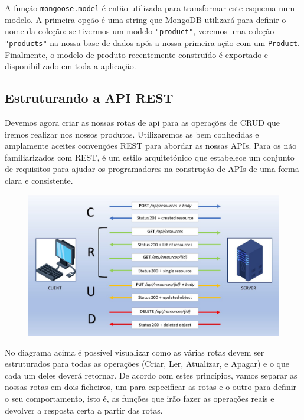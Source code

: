 A função \texttt{mongoose.model} é então utilizada para transformar este esquema num modelo. A primeira opção é uma string que MongoDB utilizará para definir o nome da coleção: se tivermos um modelo \texttt{"product"}, veremos uma coleção \texttt{"products"} na nossa base de dados após a nossa primeira ação com um \texttt{Product}. Finalmente, o modelo de produto recentemente construído é exportado e disponibilizado em toda a aplicação.

\subsection{Estruturando a API REST}

Devemos agora criar as nossas rotas de api para as operações de CRUD que iremos realizar nos nossos produtos. Utilizaremos as bem conhecidas e amplamente aceites convenções REST para abordar as nossas APIs. Para os não familiarizados com REST, é um estilo arquitetónico que estabelece um conjunto de requisitos para ajudar os programadores na construção de APIs de uma forma clara e consistente.

\begin{figure}[H]
    \centering
    \includegraphics[width=\textwidth]{Figures/1. Tutorial/crud_guidelines.jpeg}
    \label{fig: crud guidelines}
\end{figure}

No diagrama acima é possível visualizar como as várias rotas devem ser estruturados para todas as operações (Criar, Ler, Atualizar, e Apagar) e o que cada um deles deverá retornar. De acordo com estes princípios, vamos separar as nossas rotas em dois ficheiros, um para especificar as rotas e o outro para definir o seu comportamento, isto é, as funções que irão fazer as operações reais e devolver a resposta certa a partir das rotas.

